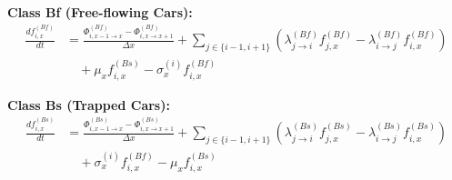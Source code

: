 \documentclass[11pt,a4paper]{article}
\begin{document}
\textbf{Class Bf (Free-flowing Cars):}
\begin{equation}
\begin{aligned}
\frac{d f_{i,x}^{(Bf)}}{dt} &= \frac{\Phi_{i,x-1\rightarrow x}^{(Bf)} - \Phi_{i,x\rightarrow x+1}^{(Bf)}}{\Delta x} +
\sum_{j\in\{i-1,i+1\}} \left( \lambda_{j\rightarrow i}^{(Bf)} f_{j,x}^{(Bf)} - \lambda_{i\rightarrow j}^{(Bf)} f_{i,x}^{(Bf)} \right) \\
&\quad + \mu_{x} f_{i,x}^{(Bs)} - \sigma_{x}^{(i)} f_{i,x}^{(Bf)}
\end{aligned}
\end{equation}

\textbf{Class Bs (Trapped Cars):}
\begin{equation}
\begin{aligned}
\frac{d f_{i,x}^{(Bs)}}{dt} &= \frac{\Phi_{i,x-1\rightarrow x}^{(Bs)} - \Phi_{i,x\rightarrow x+1}^{(Bs)}}{\Delta x} +
\sum_{j\in\{i-1,i+1\}} \left( \lambda_{j\rightarrow i}^{(Bs)} f_{j,x}^{(Bs)} - \lambda_{i\rightarrow j}^{(Bs)} f_{i,x}^{(Bs)} \right) \\
&\quad + \sigma_{x}^{(i)} f_{i,x}^{(Bf)} - \mu_{x} f_{i,x}^{(Bs)}
\end{aligned}
\end{equation}
\end{document}
